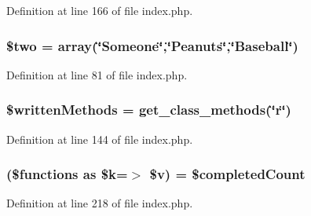 Definition at line 166 of file index.\-php.

\hypertarget{index_8php_a6c7519bde09ff89a11a474606e57547f}{
\subsubsection[{\$two}]{\setlength{\rightskip}{0pt plus 5cm}\$two = array(\char`\"{}Someone\char`\"{},\char`\"{}Peanuts\char`\"{},\char`\"{}Baseball\char`\"{})}}\label{index_8php_a6c7519bde09ff89a11a474606e57547f}


Definition at line 81 of file index.\-php.

\hypertarget{index_8php_a2e64f0494f7eccf90168af7f67198650}{
\subsubsection[{\$written\-Methods}]{\setlength{\rightskip}{0pt plus 5cm}\$written\-Methods = get\-\_\-class\-\_\-methods(\char`\"{}r\char`\"{})}}\label{index_8php_a2e64f0494f7eccf90168af7f67198650}


Definition at line 144 of file index.\-php.

\hypertarget{index_8php_a1b77627b646134ac307a24cf90261ebb}{
\subsubsection[{foreach}]{(\$functions as \$k=$>$ \$v) = \$completed\-Count}}\label{index_8php_a1b77627b646134ac307a24cf90261ebb}


Definition at line 218 of file index.\-php.

